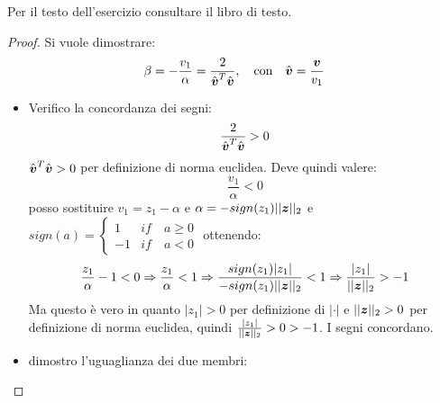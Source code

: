 \begin{exercise}[3.28]
Per il testo dell'esercizio consultare il libro di testo.
\end{exercise}
\label{exercise:exercise328}
\begin{proof}
Si vuole dimostrare:
\begin{displaymath}
\beta = -\frac{v_{1}}{\alpha} = \frac{2}{\hat{\boldsymbol{v}}^{T}\hat{\boldsymbol{v}}},
\quad
\text{con} \quad \hat{\boldsymbol{v}} = \frac{\boldsymbol{v}}{v_{1}}
\end{displaymath} 
\begin{itemize}
  \item Verifico la concordanza dei segni:
  \begin{displaymath}
    \frac{2}{\hat{\boldsymbol{v}}^{T}\hat{\boldsymbol{v}}} > 0
  \end{displaymath}
  $\hat{\boldsymbol{v}}^{T}\hat{\boldsymbol{v}} > 0$ per definizione di norma euclidea.
  Deve quindi valere:
  \begin{displaymath}
  \frac{v_{1}}{\alpha} < 0
  \end{displaymath}
  posso sostituire $v_{1} = z_{1} - \alpha$ e $\alpha =
  -sign(z_{1})||\boldsymbol{z}||_{2}$ e $sign(a) = \left \{ \begin{array}{ll} 1 & if
  \quad a \geq 0 \\ -1 & if \quad a
  < 0 \end{array} \right .$ ottenendo:
  \begin{displaymath}
  \frac{z_{1}}{\alpha} - 1 < 0 \Rightarrow \frac{z_{1}}{\alpha} < 1 \Rightarrow
  \frac{sign(z_{1})|z_{1}|}{-sign(z_{1})||\boldsymbol{z}||_{2}} < 1 \Rightarrow
  \frac{|z_{1}|}{||\boldsymbol{z}||_{2}} > -1
  \end{displaymath}
  Ma questo \`e vero in quanto $|z_{1}| > 0$ per definizione di $|\cdot|$ e
  $||\boldsymbol{z}||_{2} > 0$ per definizione di norma euclidea, quindi
  $\frac{|z_{1}|}{||\boldsymbol{z}||_{2}} > 0 > -1$. I segni concordano.
  
  \item dimostro l'uguaglianza dei due membri:
  

\end{itemize}
\end{proof}
